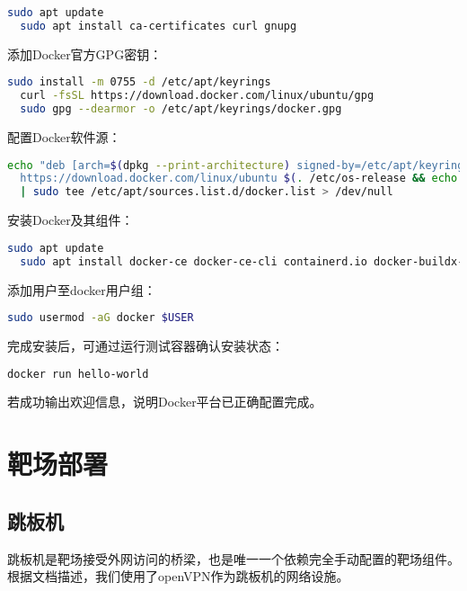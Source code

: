 \documentclass[lang=cn,10pt]{elegantbook}
\begin{document}
\begin{lstlisting}[language=bash]
  sudo apt update
  sudo apt install ca-certificates curl gnupg
\end{lstlisting}

添加Docker官方GPG密钥：

\begin{lstlisting}[language=bash]
  sudo install -m 0755 -d /etc/apt/keyrings
  curl -fsSL https://download.docker.com/linux/ubuntu/gpg
  sudo gpg --dearmor -o /etc/apt/keyrings/docker.gpg
\end{lstlisting}

配置Docker软件源：

\begin{lstlisting}[language=bash]
  echo "deb [arch=$(dpkg --print-architecture) signed-by=/etc/apt/keyrings/docker.gpg]
  https://download.docker.com/linux/ubuntu $(. /etc/os-release && echo "$VERSION_CODENAME") stable"
  | sudo tee /etc/apt/sources.list.d/docker.list > /dev/null
\end{lstlisting}

安装Docker及其组件：

\begin{lstlisting}[language=bash]
  sudo apt update
  sudo apt install docker-ce docker-ce-cli containerd.io docker-buildx-plugin docker-compose-plugin
\end{lstlisting}

添加用户至docker用户组：

\begin{lstlisting}[language=bash]
  sudo usermod -aG docker $USER
\end{lstlisting}

完成安装后，可通过运行测试容器确认安装状态：

\begin{lstlisting}[language=bash]
  docker run hello-world
\end{lstlisting}

若成功输出欢迎信息，说明Docker平台已正确配置完成。


\section{靶场部署}

\subsection{跳板机}

跳板机是靶场接受外网访问的桥梁，也是唯一一个依赖完全手动配置的靶场组件。根据文档描述，我们使用了openVPN作为跳板机的网络设施。
\end{document}
